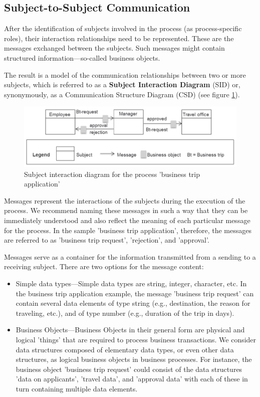 \subsection{Subject-to-Subject Communication}

After the identification of subjects involved in the process (as process-specific roles), their interaction relationships need to be represented. These are the messages exchanged between the subjects. Such messages might contain structured information—so-called business objects.

The result is a model of the communication relationships between two or more subjects, which is referred to as a \textbf{Subject Interaction Diagram} (SID) or, synonymously, as a Communication Structure Diagram (CSD) (see figure \ref{fig:beispiel-SubjectInteraction}).

\begin{figure}[htbp]
	\centering
	\includegraphics[width=14cm]{Figures/Ontology/SubjectInteraction/Beispiel-Subject-Interaction.png}
	\caption[Subject interaction diagram]{Subject interaction diagram for the process 'business trip application'}
	\label{fig:beispiel-SubjectInteraction}
\end{figure}

Messages represent the interactions of the subjects during the execution of the process. We recommend naming these messages in such a way that they can be immediately understood and also reflect the meaning of each particular message for the process. In the sample 'business trip application', therefore, the messages are referred to as 'business trip request', 'rejection', and 'approval'.

Messages serve as a container for the information transmitted from a sending to a receiving subject. There are two options for the message content:

\begin{itemize}
	\item     Simple data types---Simple data types are string, integer, character, etc. In the business trip application example, the message 'business trip request' can contain several data elements of type string (e.g., destination, the reason for traveling, etc.), and of type number (e.g., duration of the trip in days).
	\item Business Objects---Business Objects in their general form are physical and logical 'things' that are required to process business transactions. We consider data structures composed of elementary data types, or even other data structures, as logical business objects in business processes. For instance, the business object 'business trip request' could consist of the data structures 'data on applicants', 'travel data', and 'approval data' with each of these in turn containing multiple data elements.
\end{itemize}

